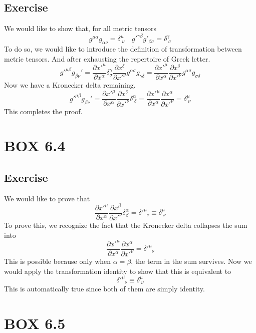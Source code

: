 \documentclass[12pt]{memoir}
\begin{document}
    \subsection{Exercise}
    We would like to show that, for all metric tensors
    \[
    g^{\mu\alpha}g_{\alpha\nu} = \delta^{\mu}_{\;\nu} \quad g'^{\gamma\beta}g'_{\beta\sigma} = \delta^{\gamma}_{\;\sigma}
    \]
    To do so, we would like to introduce the definition of transformation between metric tensors. And after exhausting the repertoire of Greek letter.
    \[
    g'^{\mu \beta} g_{\beta \nu}' = \frac{\partial x'^{\mu}}{\partial x^{\alpha}} \delta^{\gamma}_{\sigma} \frac{\partial x^{\delta}}{\partial x'^{\nu}} g^{\alpha \sigma} g_{\gamma \delta} = \frac{\partial x'^{\mu}}{\partial x^{\alpha}} \frac{\partial x^{\delta}}{\partial x'^{\nu}} g^{\alpha \sigma} g_{\sigma \delta}
    \]
    Now we have a Kronecker delta remaining.
    \[
    g'^{\mu \beta} g_{\beta \nu}' = \frac{\partial x'^{\mu}}{\partial x^{\alpha}} \frac{\partial x^{\delta}}{\partial x'^{\nu}} \delta^{\alpha}_{\;\delta} = \frac{\partial x'^{\mu}}{\partial x^{\alpha}} \frac{\partial x^{\alpha}}{\partial x'^{\nu}} = \delta^{\mu}_{\;\nu}
    \]
    This completes the proof. 

\section{BOX 6.4}
    \subsection{Exercise}
    We would like to prove that
    \[
    \frac{\partial x'^{\mu}}{\partial x^{\alpha}} \frac{\partial x^{\beta}}{\partial x'^{\nu}} \delta^{\alpha}_{\beta} = \delta'^{\mu}_{\;\;\nu} \equiv \delta^{\mu}_{\;\nu}
    \]
    To prove this, we recognize the fact that the Kronecker delta collapses the sum into
    \[
    \frac{\partial x'^{\mu}}{\partial x^{\alpha}} \frac{\partial x^{\alpha}}{\partial x'^{\nu}} = \delta'^{\mu}_{\;\;\nu}
    \]
    This is possible because only when $\alpha = \beta$, the term in the sum survives. Now we would apply the transformation identity to show that this is equivalent to
    \[
    \delta'^{\mu}_{\;\;\nu} \equiv \delta^{\mu}_{\;\nu}
    \]
    This is automatically true since both of them are simply identity. 

\section{BOX 6.5}
\end{document}

